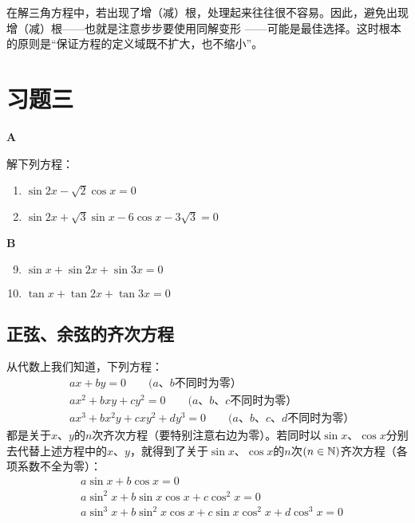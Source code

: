 在解三角方程中，若出现了增（减）根，处理起来往往很不容易。因此，避免出现增（减）根——也就是注意步步要使用同解变形
——可能是最佳选择。这时根本的原则是“保证方程的定义域既不扩大，也不缩小”。

\section*{习题三}
\begin{center}
    \bfseries A
\end{center}

解下列方程：
\begin{enumerate}
    \item $\sin2x-\sqrt{2} \cos x=0$
    \item $\sin2x+\sqrt{3}\sin x-6\cos x -3\sqrt{3}=0$
\end{enumerate}


\begin{center}
    \bfseries B
\end{center}
\begin{multicols}{2}
\begin{enumerate}\setcounter{enumi}{8}
    \item $\sin x+\sin 2x+\sin 3x=0$
    \item $\tan x+\tan 2x+\tan 3x=0$
\end{enumerate}
\end{multicols}

\subsection{正弦、余弦的齐次方程}
从代数上我们知道，下列方程：
\[\begin{split}
&ax+by=0\qquad \text{($a$、$b$不同时为零）}\\
&ax^2+bxy+cy^2=0\qquad \text{($a$、$b$、$c$不同时为零）}\\
&ax^3+bx^2y+cxy^2+dy^3=0\qquad \text{($a$、$b$、$c$、$d$不同时为零）}
\end{split}\]
都是关于$x$、$y$的$n$次齐次方程（要特别注意右边为零）。若同时以$\sin x$、$\cos x$分别去代替上述方程中的$x$、$y$，就得到了关于$\sin x$、$\cos x$的$n$次$(n\in\mathbb{N})$齐次方程（各项系数不全为零）：
\[\begin{split}
&  a\sin x+b\cos x=0\\
&a\sin^2x+b\sin x\cos x+c\cos^2x=0\\
&a\sin^3x+b\sin^2x\cos x+c\sin x\cos^2x+d\cos^3x=0
\end{split}\]

